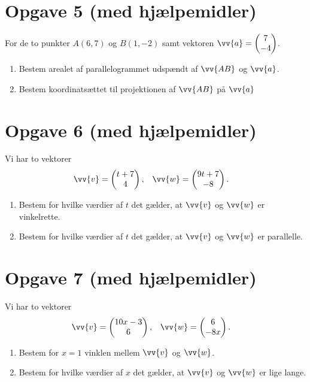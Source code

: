 \section*{Opgave 5 \large (med hjælpemidler) }
For de to punkter $A(6,7)$ og $B(1,-2)$ samt vektoren $\vv{a} = \begin{pmatrix}
7\\-4
\end{pmatrix}$.
\begin{enumerate}[label=\roman*)]
\item Bestem arealet af parallelogrammet udspændt af $\vv{AB}$ og $\vv{a}$.
\item Bestem koordinatsættet til projektionen af $\vv{AB}$ på $\vv{a}$
\end{enumerate}

\section*{Opgave 6 \large (med hjælpemidler) }
Vi har to vektorer 
\begin{align*}
&\vv{v} =\begin{pmatrix}
t+7\\4
\end{pmatrix}, &&\vv{w} =\begin{pmatrix}
9t+7\\-8
\end{pmatrix}.
\end{align*}
\begin{enumerate}[label=\roman*)]
\item Bestem for hvilke værdier af $t$ det gælder, at $\vv{v}$ og $\vv{w}$ er vinkelrette.
\item Bestem for hvilke værdier af $t$ det gælder, at $\vv{v}$ og $\vv{w}$ er parallelle.
\end{enumerate}



\section*{Opgave 7 \large (med hjælpemidler) }

Vi har to vektorer 
\begin{align*}
&\vv{v} =\begin{pmatrix}
10x-3\\6
\end{pmatrix}, &&\vv{w} =\begin{pmatrix}
6\\-8x
\end{pmatrix}.
\end{align*}
\begin{enumerate}[label=\roman*)]
\item Bestem for  $x=1$ vinklen mellem $\vv{v}$ og $\vv{w}$.
\item Bestem for hvilke værdier af $x$ det gælder, at $\vv{v}$ og $\vv{w}$ er lige lange.
\end{enumerate}


